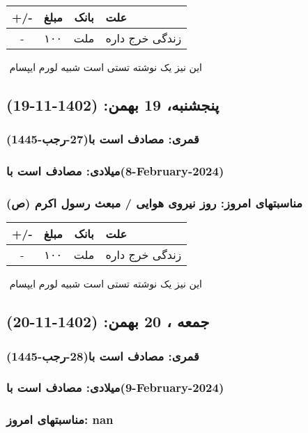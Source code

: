 \documentclass{article}
\newcommand{\rnote}[1]{\marginpar{\textcolor{color}{\StrSubstitute{\##1}{ }{\_}}}}
\newcommand{\myRow}[4]{
    #1 & #2 & #3 & #4 \\ \hline
}
\begin{document}
\begin{tabular}{ | c | c | c | p{5cm} |}
    \hline
    \myRow{ +/- }{مبلغ}{بانک}{علت}
    \myRow{-}{۱۰۰}{ملت}{زندگی خرج داره}
\end{tabular}
\newline
\newline

‌
\rnote{تست}
این نیز یک نوشته تستی است شبیه لورم ایپسام




\newpage
{}
\textcolor{color}{
\section{ پنجشنبه، 19 بهمن: (1402-11-19) }
\subsubsection*{قمری: مصادف است با(27-رجب-1445)} 
\subsubsection*{میلادی: مصادف است با(8-February-2024)}
\subsubsection*{مناسبتهای امروز: روز نیروی هوایی /  مبعث رسول اکرم (ص)}
}


\begin{tabular}{ | c | c | c | p{5cm} |}
    \hline
    \myRow{ +/- }{مبلغ}{بانک}{علت}
    \myRow{-}{۱۰۰}{ملت}{زندگی خرج داره}
\end{tabular}
\newline
\newline

‌
\rnote{تست}
این نیز یک نوشته تستی است شبیه لورم ایپسام




\newpage
{}
\textcolor{color}{
\section{ جمعه ، 20 بهمن: (1402-11-20) }
\subsubsection*{قمری: مصادف است با(28-رجب-1445)} 
\subsubsection*{میلادی: مصادف است با(9-February-2024)}
\subsubsection*{مناسبتهای امروز: nan}
}
\end{document}
